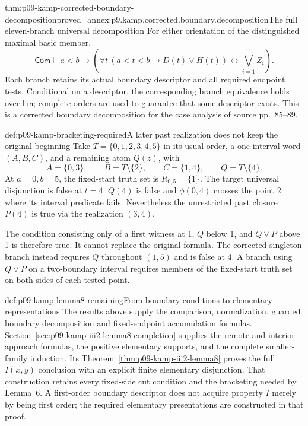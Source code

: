 \begin{hblemma}{thm:p09-kamp-corrected-boundary-decomposition}{proved=annex:p9.kamp.corrected.boundary.decomposition}{The full eleven-branch universal decomposition}
For either orientation of the distinguished maximal basic member,
\[
 \mathsf{Com}\models a<b\longrightarrow
 \left(\forall t\,(a<t<b\to D(t)\lor H(t))
                 \longleftrightarrow\bigvee_{i=1}^{11}Z_i\right).
\]
Each branch retains its actual boundary descriptor and all required
endpoint tests. Conditional on a descriptor, the corresponding branch
equivalence holds over \(\mathsf{Lin}\); complete orders are used
to guarantee that some descriptor exists. This is a corrected
boundary decomposition for the case analysis of source pp.~85--89.
\end{hblemma}

\begin{hbexample}{def:p09-kamp-bracketing-required}{A later past realization does not keep the original beginning}
Take \(T=\{0,1,2,3,4,5\}\) in its usual order, a one-interval
word \((A,B,C)\), and a remaining atom \(Q(z)\), with
\[
 A=\{0,3\},\qquad B=T\setminus\{2\},\qquad
 C=\{1,4\},\qquad Q=T\setminus\{4\}.
\]
At \(a=0,b=5\), the fixed-start truth set is \(R_{0,5}=\{1\}\).
The target universal disjunction is false at \(t=4\):
\(Q(4)\) is false and \(\phi(0,4)\) crosses the point 2
where its interval predicate fails. Nevertheless the unrestricted past
closure \(P(4)\) is true via the realization \((3,4)\).

The condition consisting only of a first witness at 1, \(Q\) below
1, and \(Q\lor P\) above 1 is therefore true. It cannot replace
the original formula. The corrected singleton branch instead requires
\(Q\) throughout \((1,5)\) and is false at 4. A branch using
\(Q\lor P\) on a two-boundary interval requires members of the
fixed-start truth set on both sides of each tested point.
\end{hbexample}

\begin{proofboundary}{def:p09-kamp-lemma8-remaining}{From boundary conditions to elementary representations}
The results above supply the comparison, normalization, guarded boundary
decomposition and fixed-endpoint accumulation formulas.
Section~\ref{sec:p09-kamp-iii2-lemma8-completion} supplies the remote
and interior approach formulas, the positive elementary supports, and the
complete smaller-family induction. Its
Theorem~\ref{thm:p09-kamp-iii2-lemma8} proves the full \(I(x,y)\)
conclusion with an explicit finite elementary disjunction.
That construction retains every fixed-side cut condition and the
bracketing needed by Lemma~6. A first-order boundary descriptor does not
acquire property \(I\) merely by being first order; the required
elementary presentations are constructed in that proof.
\end{proofboundary}
